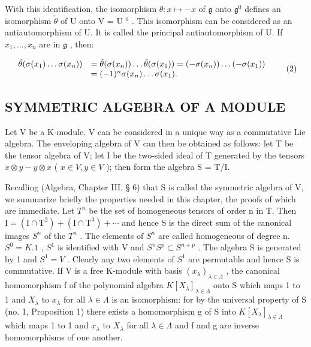 With this identification, the isomorphism \(\theta: x \mapsto -x\) of \(\mathfrak{g}\) onto \(\mathfrak{g}^0\) defines an isomorphism \(\tilde{\theta}\) of U onto V = U \(^0\) . This isomorphism can be considered as an antiautomorphism of U. It is called the principal antiautomorphism of U. If \(x_{1}, \ldots, x_{n}\) are in \(\mathfrak{g}\) , then:

\[
\begin{array}{r l} \tilde {\theta} (\sigma (x _ {1}) \dots \sigma (x _ {n})) & = \tilde {\theta} (\sigma (x _ {n})) \dots \tilde {\theta} (\sigma (x _ {1})) = (- \sigma (x _ {n})) \dots (- \sigma (x _ {1})) \\ & = (- 1) ^ {n} \sigma (x _ {n}) \dots \sigma (x _ {1}). \end{array}\tag{2}
\]

\subsection{SYMMETRIC ALGEBRA OF A MODULE}

Let V be a K-module. V can be considered in a unique way as a commutative Lie algebra. The enveloping algebra of V can then be obtained as follows: let T be the tensor algebra of V; let I be the two-sided ideal of T generated by the tensors \(x \otimes y - y \otimes x\) ( \(x \in V, y \in V\) ); then form the algebra S = T/I.

Recalling (Algebra, Chapter III, § 6) that S is called the symmetric algebra of V, we summarize briefly the properties needed in this chapter, the proofs of which are immediate. Let \(T^{n}\) be the set of homogeneous tensors of order n in T. Then \(\mathrm{I} = (\mathrm{I} \cap \mathrm{T}^{2}) + (\mathrm{I} \cap \mathrm{T}^{3}) + \cdots\) and hence S is the direct sum of the canonical images \(S^{n}\) of the \(T^{n}\) . The elements of \(S^{n}\) are called homogeneous of degree n.~\(S^{0} = K.1\) , \(S^{1}\) is identified with V and \(S^{n}S^{p} \subset S^{n+p}\) . The algebra S is generated by 1 and \(S^{1} = V\) . Clearly any two elements of \(S^{1}\) are permutable and hence S is commutative. If V is a free K-module with basis \((x_{\lambda})_{\lambda \in \Lambda}\) , the canonical homomorphism f of the polynomial algebra \(K[X_{\lambda}]_{\lambda \in \Lambda}\) onto S which maps 1 to 1 and \(X_{\lambda}\) to \(x_{\lambda}\) for all \(\lambda \in \Lambda\) is an isomorphism: for by the universal property of S (no. 1, Proposition 1) there exists a homomorphism g of S into \(K[X_{\lambda}]_{\lambda \in \Lambda}\) which maps 1 to 1 and \(x_{\lambda}\) to \(X_{\lambda}\) for all \(\lambda \in \Lambda\) and f and g are inverse homomorphisms of one another.

